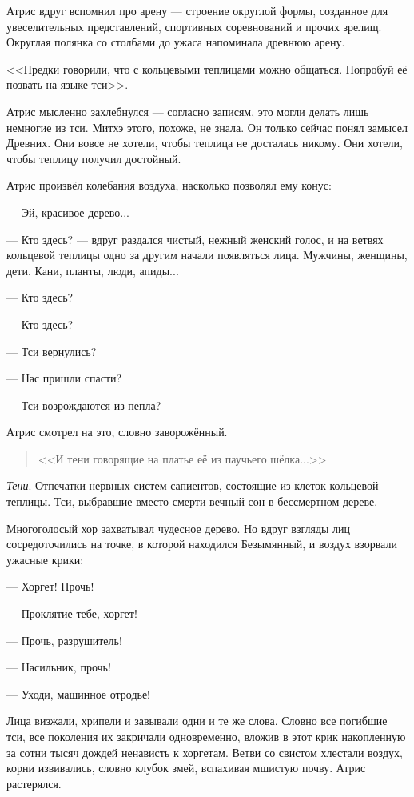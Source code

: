 Атрис вдруг вспомнил про арену --- строение округлой формы, созданное для увеселительных представлений, спортивных соревнований и прочих зрелищ.
Округлая полянка со столбами до ужаса напоминала древнюю арену.

<<Предки говорили, что с кольцевыми теплицами можно общаться.
Попробуй её позвать на языке тси>>.

Атрис мысленно захлебнулся --- согласно записям, это могли делать лишь немногие из тси.
Митхэ этого, похоже, не знала.
Он только сейчас понял замысел Древних.
Они вовсе не хотели, чтобы теплица не досталась никому.
Они хотели, чтобы теплицу получил достойный.

Атрис произвёл колебания воздуха, насколько позволял ему конус:

--- Эй, красивое дерево...

--- Кто здесь? --- вдруг раздался чистый, нежный женский голос, и на ветвях кольцевой теплицы одно за другим начали появляться лица.
Мужчины, женщины, дети.
Кани, планты, люди, апиды...

--- Кто здесь?

--- Кто здесь?

--- Тси вернулись?

--- Нас пришли спасти?

--- Тси возрождаются из пепла?

Атрис смотрел на это, словно заворожённый.

\begin{verse}
<<И тени говорящие на платье её из паучьего шёлка...>>
\end{verse}

\emph{Тени}.
Отпечатки нервных систем сапиентов, состоящие из клеток кольцевой теплицы.
Тси, выбравшие вместо смерти вечный сон в бессмертном дереве.

Многоголосый хор захватывал чудесное дерево.
Но вдруг взгляды лиц сосредоточились на точке, в которой находился Безымянный, и воздух взорвали ужасные крики:

--- Хоргет!
Прочь!

--- Проклятие тебе, хоргет!

--- Прочь, разрушитель!

--- Насильник, прочь!

--- Уходи, машинное отродье!

Лица визжали, хрипели и завывали одни и те же слова.
Словно все погибшие тси, все поколения их закричали одновременно, вложив в этот крик накопленную за сотни тысяч дождей ненависть к хоргетам.
Ветви со свистом хлестали воздух, корни извивались, словно клубок змей, вспахивая мшистую почву.
Атрис растерялся.

